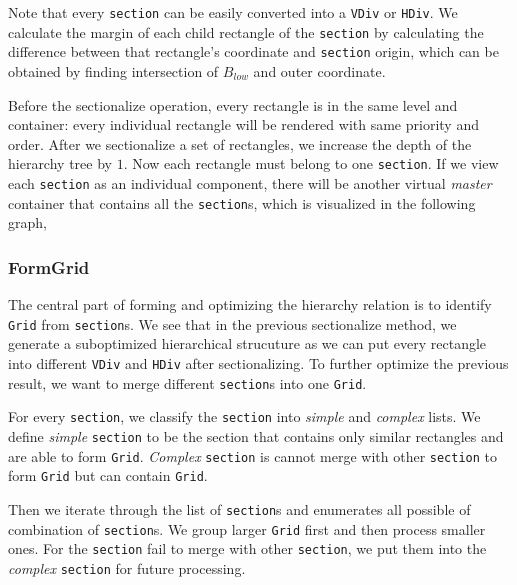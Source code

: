 \documentclass[runningheads]{llncs}
\begin{document}
Note that every \lstinline{section} can be easily converted into a \lstinline{VDiv} or \lstinline{HDiv}. We calculate the margin of each child rectangle of the \lstinline{section} by calculating the difference between that rectangle's coordinate and \lstinline{section} origin, which can be obtained by finding intersection of $B_{low}$ and outer coordinate.

Before the sectionalize operation, every rectangle is in the same level and container: every individual rectangle will be rendered with same priority and order. After we sectionalize a set of rectangles, we increase the depth of the hierarchy tree by $1$. Now each rectangle must belong to one \lstinline{section}. If we view each \lstinline{section} as an individual component, there will be another virtual \textit{master} container that contains all the \lstinline{section}s, which is visualized in the following graph,

\subsubsection{FormGrid} The central part of forming and optimizing the hierarchy relation is to identify \lstinline{Grid} from \lstinline{section}s. We see that in the previous sectionalize method, we generate a suboptimized hierarchical strucuture as we can put every rectangle into different \lstinline{VDiv} and \lstinline{HDiv} after sectionalizing. To further optimize the previous result, we want to merge different \lstinline{section}s into one \lstinline{Grid}.

For every \lstinline{section}, we classify the \lstinline{section} into \textit{simple} and \textit{complex} lists. We define \textit{simple} \lstinline{section} to be the section that contains only similar rectangles and are able to form \lstinline{Grid}. \textit{Complex} \lstinline{section} is cannot merge with other \lstinline{section} to form \lstinline{Grid} but can contain \lstinline{Grid}. 


Then we iterate through the list of \lstinline{section}s and enumerates all possible of combination of \lstinline{section}s. We group larger \lstinline{Grid} first and then process smaller ones. For the \lstinline{section} fail to merge with other \lstinline{section}, we put them into the \textit{complex} \lstinline{section} for future processing.
\end{document}
